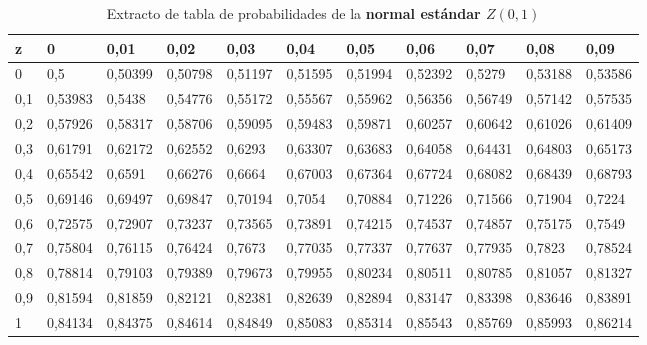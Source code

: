 \documentclass[addpoints,spanish, 12pt,a4paper]{exam}
\begin{document}
\begin{landscape}
\begin{table}[]
\Large
\centering
\caption{Extracto de tabla de probabilidades de la \textbf{normal estándar $Z(0,1)$}}
\label{my-label}

\begin{tabular}{l|llllllllll}
z   & 0       & 0,01    & 0,02    & 0,03    & 0,04    & 0,05    & 0,06    & 0,07    & 0,08    & 0,09    \\
\hline
0   & 0,5     & 0,50399 & 0,50798 & 0,51197 & 0,51595 & 0,51994 & 0,52392 & 0,5279  & 0,53188 & 0,53586 \\
0,1 & 0,53983 & 0,5438  & 0,54776 & 0,55172 & 0,55567 & 0,55962 & 0,56356 & 0,56749 & 0,57142 & 0,57535 \\
0,2 & 0,57926 & 0,58317 & 0,58706 & 0,59095 & 0,59483 & 0,59871 & 0,60257 & 0,60642 & 0,61026 & 0,61409 \\
0,3 & 0,61791 & 0,62172 & 0,62552 & 0,6293  & 0,63307 & 0,63683 & 0,64058 & 0,64431 & 0,64803 & 0,65173 \\
0,4 & 0,65542 & 0,6591  & 0,66276 & 0,6664  & 0,67003 & 0,67364 & 0,67724 & 0,68082 & 0,68439 & 0,68793 \\
0,5 & 0,69146 & 0,69497 & 0,69847 & 0,70194 & 0,7054  & 0,70884 & 0,71226 & 0,71566 & 0,71904 & 0,7224  \\
0,6 & 0,72575 & 0,72907 & 0,73237 & 0,73565 & 0,73891 & 0,74215 & 0,74537 & 0,74857 & 0,75175 & 0,7549  \\
0,7 & 0,75804 & 0,76115 & 0,76424 & 0,7673  & 0,77035 & 0,77337 & 0,77637 & 0,77935 & 0,7823  & 0,78524 \\
0,8 & 0,78814 & 0,79103 & 0,79389 & 0,79673 & 0,79955 & 0,80234 & 0,80511 & 0,80785 & 0,81057 & 0,81327 \\
0,9 & 0,81594 & 0,81859 & 0,82121 & 0,82381 & 0,82639 & 0,82894 & 0,83147 & 0,83398 & 0,83646 & 0,83891 \\
1   & 0,84134 & 0,84375 & 0,84614 & 0,84849 & 0,85083 & 0,85314 & 0,85543 & 0,85769 & 0,85993 & 0,86214 \\

\end{tabular}
\end{table}
\end{landscape}
\end{document}
